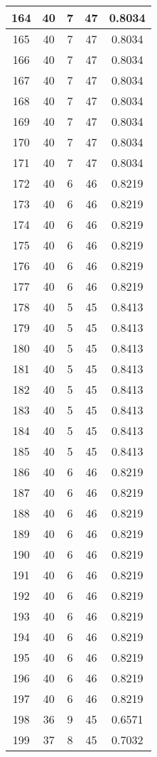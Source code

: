 \documentclass[letterpaper, 12pt]{article}
\begin{document}
\begin{longtable}{|c|c|c|c|c|}
\hline
164 & 40 & 7 & 47 & 0.8034 \\
\hline
165 & 40 & 7 & 47 & 0.8034 \\
\hline
166 & 40 & 7 & 47 & 0.8034 \\
\hline
167 & 40 & 7 & 47 & 0.8034 \\
\hline
168 & 40 & 7 & 47 & 0.8034 \\
\hline
169 & 40 & 7 & 47 & 0.8034 \\
\hline
170 & 40 & 7 & 47 & 0.8034 \\
\hline
171 & 40 & 7 & 47 & 0.8034 \\
\hline
172 & 40 & 6 & 46 & 0.8219 \\
\hline
173 & 40 & 6 & 46 & 0.8219 \\
\hline
174 & 40 & 6 & 46 & 0.8219 \\
\hline
175 & 40 & 6 & 46 & 0.8219 \\
\hline
176 & 40 & 6 & 46 & 0.8219 \\
\hline
177 & 40 & 6 & 46 & 0.8219 \\
\hline
178 & 40 & 5 & 45 & 0.8413 \\
\hline
179 & 40 & 5 & 45 & 0.8413 \\
\hline
180 & 40 & 5 & 45 & 0.8413 \\
\hline
181 & 40 & 5 & 45 & 0.8413 \\
\hline
182 & 40 & 5 & 45 & 0.8413 \\
\hline
183 & 40 & 5 & 45 & 0.8413 \\
\hline
184 & 40 & 5 & 45 & 0.8413 \\
\hline
185 & 40 & 5 & 45 & 0.8413 \\
\hline
186 & 40 & 6 & 46 & 0.8219 \\
\hline
187 & 40 & 6 & 46 & 0.8219 \\
\hline
188 & 40 & 6 & 46 & 0.8219 \\
\hline
189 & 40 & 6 & 46 & 0.8219 \\
\hline
190 & 40 & 6 & 46 & 0.8219 \\
\hline
191 & 40 & 6 & 46 & 0.8219 \\
\hline
192 & 40 & 6 & 46 & 0.8219 \\
\hline
193 & 40 & 6 & 46 & 0.8219 \\
\hline
194 & 40 & 6 & 46 & 0.8219 \\
\hline
195 & 40 & 6 & 46 & 0.8219 \\
\hline
196 & 40 & 6 & 46 & 0.8219 \\
\hline
197 & 40 & 6 & 46 & 0.8219 \\
\hline
198 & 36 & 9 & 45 & 0.6571 \\
\hline
199 & 37 & 8 & 45 & 0.7032 \\
\hline
\end{longtable}
\end{document}
